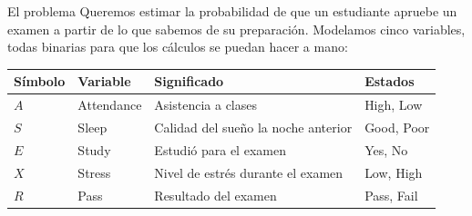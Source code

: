 \documentclass[11pt]{beamer}
\begin{document}
\begin{frame}{El problema}
  Queremos estimar la probabilidad de que un estudiante apruebe un examen a partir de lo que sabemos de su preparación. Modelamos cinco variables, todas binarias para que los cálculos se puedan hacer a mano:

  \vspace{0.3cm}
  \small
  \begin{tabular}{llll}
    \toprule
    Símbolo & Variable & Significado & Estados \\
    \midrule
    $A$ & Attendance & Asistencia a clases & High, Low \\
    $S$ & Sleep & Calidad del sueño la noche anterior & Good, Poor \\
    $E$ & Study & Estudió para el examen & Yes, No \\
    $X$ & Stress & Nivel de estrés durante el examen & Low, High \\
    $R$ & Pass & Resultado del examen & Pass, Fail \\
    \bottomrule
  \end{tabular}
\end{frame}
\end{document}
